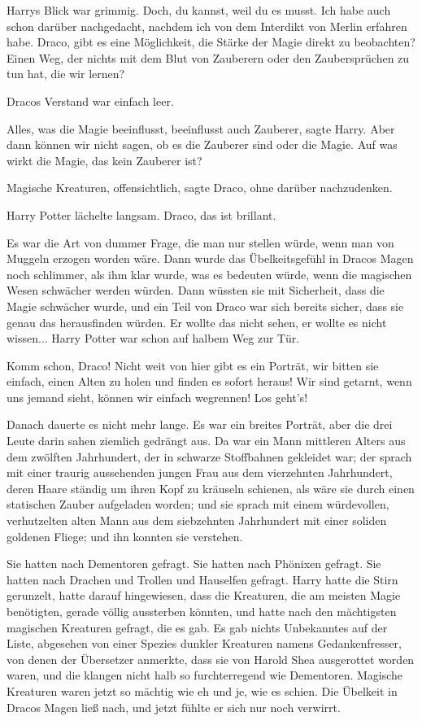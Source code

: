 Harrys Blick war grimmig. \glqq Doch, du kannst, weil du es musst. Ich habe auch
schon darüber nachgedacht, nachdem ich von dem Interdikt von Merlin erfahren
habe. Draco, gibt es eine Möglichkeit, die Stärke der Magie direkt zu
beobachten? Einen Weg, der nichts mit dem Blut von Zauberern oder den
Zaubersprüchen zu tun hat, die wir lernen?\grqq{}

Dracos Verstand war einfach leer.

\glqq Alles, was die Magie beeinflusst, beeinflusst auch Zauberer\grqq{}, sagte
Harry. \glqq Aber dann können wir nicht sagen, ob es die Zauberer sind oder die
Magie. Auf was wirkt die Magie, das kein Zauberer ist?\grqq{}

\glqq Magische Kreaturen, offensichtlich\grqq{}, sagte Draco, ohne darüber
nachzudenken.

Harry Potter lächelte langsam. \glqq Draco, das ist brillant.\grqq{}

Es war die Art von dummer Frage, die man nur stellen würde, wenn man von Muggeln
erzogen worden wäre. Dann wurde das Übelkeitsgefühl in Dracos Magen noch
schlimmer, als ihm klar wurde, was es bedeuten würde, wenn die magischen Wesen
schwächer werden würden. Dann wüssten sie mit Sicherheit, dass die Magie
schwächer wurde, und ein Teil von Draco war sich bereits sicher, dass sie genau
das herausfinden würden. Er wollte das nicht sehen, er wollte es nicht wissen...
Harry Potter war schon auf halbem Weg zur Tür.

\glqq Komm schon, Draco! Nicht weit von hier gibt es ein Porträt, wir bitten sie
einfach, einen Alten zu holen und finden es sofort heraus! Wir sind getarnt,
wenn uns jemand sieht, können wir einfach wegrennen! Los geht's!\grqq{}

Danach dauerte es nicht mehr lange. Es war ein breites Porträt, aber die drei
Leute darin sahen ziemlich gedrängt aus. Da war ein Mann mittleren Alters aus
dem zwölften Jahrhundert, der in schwarze Stoffbahnen gekleidet war; der sprach
mit einer traurig aussehenden jungen Frau aus dem vierzehnten Jahrhundert, deren
Haare ständig um ihren Kopf zu kräuseln schienen, als wäre sie durch einen
statischen Zauber aufgeladen worden; und sie sprach mit einem würdevollen,
verhutzelten alten Mann aus dem siebzehnten Jahrhundert mit einer soliden
goldenen Fliege; und ihn konnten sie verstehen.

Sie hatten nach Dementoren gefragt. Sie hatten nach Phönixen gefragt. Sie hatten
nach Drachen und Trollen und Hauselfen gefragt. Harry hatte die Stirn gerunzelt,
hatte darauf hingewiesen, dass die Kreaturen, die am meisten Magie benötigten,
gerade völlig aussterben könnten, und hatte nach den mächtigsten magischen
Kreaturen gefragt, die es gab. Es gab nichts Unbekanntes auf der Liste,
abgesehen von einer Spezies dunkler Kreaturen namens Gedankenfresser, von denen
der Übersetzer anmerkte, dass sie von Harold Shea ausgerottet worden waren, und
die klangen nicht halb so furchterregend wie Dementoren. Magische Kreaturen
waren jetzt so mächtig wie eh und je, wie es schien. Die Übelkeit in Dracos
Magen ließ nach, und jetzt fühlte er sich nur noch verwirrt.

